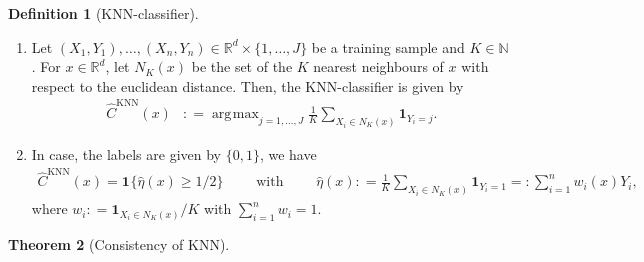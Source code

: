 \documentclass[a4paper,11pt]{article} %
\DeclareMathOperator*{\argmax}{arg\!\max}
\theoremstyle{definition}
\newtheorem{defi}{Definition}[section]
\theoremstyle{remark}
\theoremstyle{plain}
\newtheorem{thm}[defi]{Theorem}
\numberwithin{equation}{section}
\begin{document}
\begin{defi}[KNN-classifier]%
  \label{def:KNNClassifier}
  \
  \begin{enumerate}[label=(\alph*)]
    \item Let \( ( X_{1}, Y_{1} ), \dots, ( X_{n}, Y_{n} ) \in \mathbb{R}^{d}
      \times \{ 1, \dots, J \} \) be a training sample and \( K \in \mathbb{N}
      \). For \( x \in \mathbb{R}^{d} \), let \( N_{K}(x) \) be the set of the
      \( K \) nearest neighbours of \( x \) with respect to the euclidean
      distance. Then, the KNN-classifier is given by
      \begin{align*}
        \hat C^{\text{KNN}}(x) 
        & : = \argmax_{j = 1, \dots, J} 
        \frac{1}{K} \sum_{X_{i} \in N_{K}(x)} \mathbf{1}_{Y_{i} = j}.  
      \end{align*}
    \item In case, the labels are given by \( \{ 0, 1 \} \), we have
      \begin{align*}
        \hat C^{\text{KNN}}(x) 
        = \mathbf{1}_{} \{ \hat \eta(x) \ge 1 / 2 \} 
        \qquad \text{ with } \qquad 
        \hat \eta(x) 
        : = \frac{1}{K} \sum_{X_{i} \in N_{K}(x)} \mathbf{1}_{Y_{i} = 1} 
        = : \sum_{i = 1}^{n} w_{i}(x) Y_{i},
      \end{align*}
      where \( w_{i} : = \mathbf{1}_{X_{i} \in N_{K}(x)} / K  \) with \( \sum_{i
      = 1}^{n} w_{i} = 1 \). 
  \end{enumerate}
\end{defi}%

\begin{thm}[Consistency of KNN]%
  \label{thm:ConsistencyOfKNN}
  
\end{thm}%


% 
% 
\end{document}
